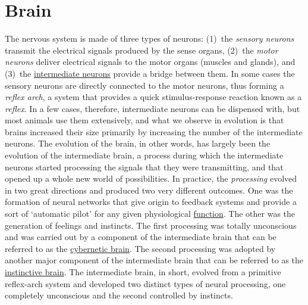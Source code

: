 \documentclass[12pt]{article}
\begin{document}
\hypertarget{brain}{}
\section{Brain}
The nervous system is made of three types of neurons: (1)~the \textit{sensory neurons} transmit the electrical signals produced by the sense organs, (2)~the \textit{motor neurons} deliver electrical signals to the motor organs (muscles and glands), and (3)~the \hyperlink{intermediate_brain}{intermediate neurons} provide a bridge between them. In some cases the sensory neurons are directly connected to the motor neurons, thus forming a \textit{reflex arch}, a system that provides a quick stimulus-response reaction known as a \textit{reflex}. In a few cases, therefore, intermediate neurons can be dispensed with, but most animals use them extensively, and what we observe in evolution is that brains increased their size primarily by increasing the number of the intermediate neurons. The evolution of the brain, in other words, has largely been the evolution of the intermediate brain, a process during which the intermediate neurons started processing the signals that they were transmitting, and that opened up a whole new world of possibilities. In practice, the \textit{processing} evolved in two great directions and produced two very different outcomes. One was the formation of neural networks that give origin to feedback systems and provide a sort of `automatic pilot' for any given physiological \hyperlink{function}{function}. The other was the generation of feelings and instincts. The first processing was totally unconscious and was carried out by a component of the intermediate brain that can be referred to as the \hyperlink{cybernetic_brain}{cybernetic brain}. The second processing was adopted by another major component of the intermediate brain that can be referred to as the \hyperlink{instinctive_brain}{instinctive brain}. The intermediate brain, in short, evolved from a primitive reflex-arch system and developed two distinct types of neural processing, one completely unconscious and the second controlled by instincts. 
 

\hypertarget{brain_as_a_modelling_system}{}
\end{document}
